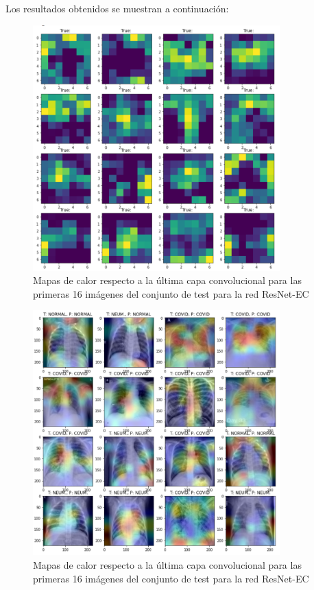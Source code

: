\documentclass[11pt,a4paper]{article}
\theoremstyle{definition}
\begin{document}
Los resultados obtenidos se muestran a continuación:

\begin{figure}[H]
\centering
\includegraphics[width=0.85\textwidth]{./images/resnetfilters}
\caption{Mapas de calor respecto a la última capa convolucional para las primeras 16 imágenes del conjunto de test para la red ResNet-EC}
\end{figure}

\begin{figure}[H]
\centering
\includegraphics[width=0.85\textwidth]{./images/resnetheatmap}
\caption{Mapas de calor respecto a la última capa convolucional para las primeras 16 imágenes del conjunto de test para la red ResNet-EC}
\end{figure}
\end{document}
